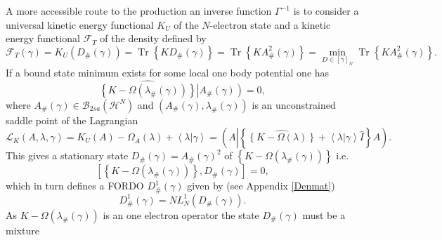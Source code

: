\documentclass[aps,preprint]{revtex4}%
\begin{document}
A more accessible route to the production an inverse function $\Gamma^{-1}$ is
to consider a universal kinetic energy functional $K_{U}$ of the $N$-electron
state and a kinetic energy functional $\mathcal{F}_{T}$ of the density defined
by
\begin{equation}
\mathcal{F}_{T}\left(  \gamma\right)  =K_{U}\left(  D_{\#}\left(
\gamma\right)  \right)  =\operatorname{Tr}\left\{  KD_{\#}\left(
\gamma\right)  \right\}  =\operatorname{Tr}\left\{  KA_{\#}^{2}\left(
\gamma\right)  \right\}  =\min_{D\in\left[  \gamma\right]  _{N}}%
\operatorname{Tr}\left\{  KA_{\#}^{2}\left(  \gamma\right)  \right\}  .
\label{KEFunc}%
\end{equation}
If a bound state minimum exists for some local one body potential one has
\begin{equation}
\widehat{\left\{  K-\Omega\left(  \lambda_{\#}\left(  \gamma\right)  \right)
\right\}  }\left\vert A_{\#}\left(  \gamma\right)  \right)  =0,
\end{equation}
where $A_{\#}\left(  \gamma\right)  \in\mathcal{B}_{2sa}\left(  \mathcal{H}%
^{N}\right)  $ and $\left(  A_{\#}\left(  \gamma\right)  ,\lambda_{\#}\left(
\gamma\right)  \right)  $ is an unconstrained saddle point of the Lagrangian
\begin{equation}
\mathcal{L}_{K}\left(  A,\lambda,\gamma\right)  =K_{U}\left(  A\right)
-\Omega_{A}\left(  \lambda\right)  +\left\langle \left.  \lambda\right\vert
\gamma\right\rangle =\left(  A\left\vert \left\{  \widehat{\left\{
K-\Omega\left(  \lambda\right)  \right\}  }+\left\langle \left.
\lambda\right\vert \gamma\right\rangle \hat{I}\right\}  \right.  A\right)  .
\end{equation}
This gives a stationary state $D_{\#}\left(  \gamma\right)  =A_{\#}\left(
\gamma\right)  ^{2}$ of $\left\{  K-\Omega\left(  \lambda_{\#}\left(
\gamma\right)  \right)  \right\}  $ i.e.
\begin{equation}
\left[  \left\{  K-\Omega\left(  \lambda_{\#}\left(  \gamma\right)  \right)
\right\}  ,D_{\#}\left(  \gamma\right)  \right]  =0,
\end{equation}
which in turn defines a FORDO $D_{\#}^{1}\left(  \gamma\right)  $ given by
(see Appendix \ref{Denmat})
\begin{equation}
D_{\#}^{1}\left(  \gamma\right)  =NL_{N}^{1}\left(  D_{\#}\left(
\gamma\right)  \right)  .
\end{equation}
As $K-\Omega\left(  \lambda_{\#}\left(  \gamma\right)  \right)  $ is an one
electron operator the state $D_{\#}\left(  \gamma\right)  $ must be a mixture
\end{document}
